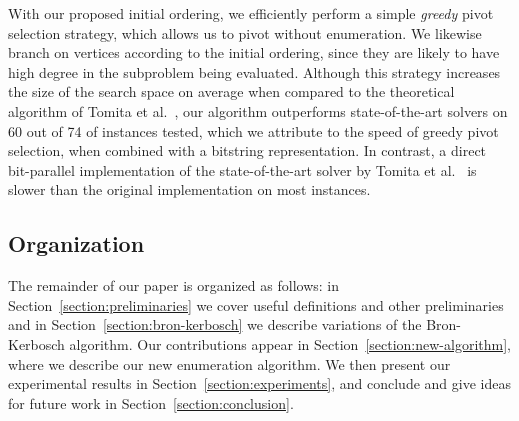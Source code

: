 \documentclass[final,1p]{elsarticle-modified}
\begin{document}
With our proposed initial ordering, we efficiently perform a simple \emph{greedy} pivot selection strategy, which allows us to pivot without enumeration. We likewise branch on vertices according to the initial ordering, since they are likely to have high degree in the subproblem being evaluated. Although this strategy increases the size of the search space on average when compared to the theoretical algorithm of Tomita et al.~\cite{tomita-2006}, our algorithm outperforms state-of-the-art solvers on 60 out of 74 of instances tested, which we attribute to the speed of greedy pivot selection, when combined with a bitstring representation. In contrast, a direct bit-parallel implementation of the state-of-the-art solver by Tomita et al.~\cite{tomita-2006} is slower than the original implementation on most instances.



\subsection{Organization}

The remainder of our paper is organized as follows: in Section~\ref{section:preliminaries}  we cover useful definitions and other preliminaries and in Section~\ref{section:bron-kerbosch}  we describe variations of the Bron-Kerbosch algorithm. Our contributions appear in Section~\ref{section:new-algorithm}, where we describe our new enumeration algorithm. We then present our experimental results in Section~\ref{section:experiments}, and conclude and give ideas for future work in Section~\ref{section:conclusion}.

\end{document}

